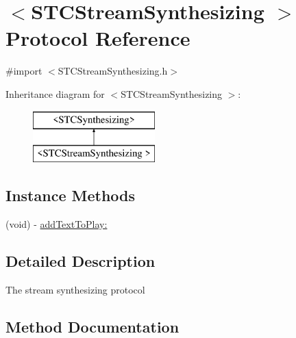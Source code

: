 \hypertarget{protocol_s_t_c_stream_synthesizing_01-p}{}\section{$<$S\+T\+C\+Stream\+Synthesizing $>$ Protocol Reference}
\label{protocol_s_t_c_stream_synthesizing_01-p}


{\ttfamily \#import $<$S\+T\+C\+Stream\+Synthesizing.\+h$>$}

Inheritance diagram for $<$S\+T\+C\+Stream\+Synthesizing $>$\+:\begin{figure}[H]
\begin{center}
\leavevmode
\includegraphics[height=2.000000cm]{protocol_s_t_c_stream_synthesizing_01-p}
\end{center}
\end{figure}
\subsection*{Instance Methods}
\begin{DoxyCompactItemize}
\item 
(void) -\/ \hyperlink{protocol_s_t_c_stream_synthesizing_01-p_aa0ecccdf5958ba2257703ebacb4bed09}{add\+Text\+To\+Play\+:}
\end{DoxyCompactItemize}


\subsection{Detailed Description}
The stream synthesizing protocol 

\subsection{Method Documentation}
\hypertarget{protocol_s_t_c_stream_synthesizing_01-p_aa0ecccdf5958ba2257703ebacb4bed09}{}\label{protocol_s_t_c_stream_synthesizing_01-p_aa0ecccdf5958ba2257703ebacb4bed09} 

